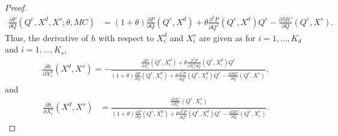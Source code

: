 \documentclass[11pt, a4paper]{article}
\theoremstyle{remark}
\begin{document}
\begin{proof}
\begin{align}
    \frac{\partial F}{\partial Q}(Q^e, X^{d}, X^{s}; \theta, MC) & = (1+\theta)\frac{\partial P}{\partial Q}(Q^e, X^{d}) + \theta\frac{\partial^2 P}{\partial Q^2}(Q^e, X^{d})Q^e - \frac{\partial MC}{\partial Q}(Q^e, X^{s}).
\end{align}
Thus, the derivative of $h$ with respect to $X^{d}_i$ and $X^{s}_i$ are given as for $i = 1, \ldots, K_d$ and $i = 1, \ldots, K_s$,
\begin{align}
    \frac{\partial h}{\partial X^{d}_{i}}(X^{d}, X^{s}) = -\frac{\frac{\partial P}{\partial X^{d}_{i}}(Q^e, X^{d}_i) + \theta\frac{\partial^2 P}{\partial X^{d}_{i}\partial Q}(Q^e, X^{d}_i)Q^e }{(1+\theta)\frac{\partial P}{\partial Q}(Q^e, X^{d}_i) + \theta\frac{\partial^2 P}{\partial Q^2}(Q^e, X^{d}_i)Q^e - \frac{\partial MC}{\partial Q}(Q^e, X^{s})}, \label{eq:foc_derivative_demand}
\end{align}
and
\begin{align}
    \frac{\partial h}{\partial X^{s}_{i}}(X^{d}, X^{s}) & = \frac{\frac{\partial MC}{\partial X^{s}_{i}}(Q^e, X^{s}_i)}{(1+\theta)\frac{\partial P}{\partial Q}(Q^e, X^{d}_i) + \theta\frac{\partial^2 P}{\partial Q^2}(Q^e, X^{d}_i)Q^e - \frac{\partial MC}{\partial Q}(Q^e, X^{s}_i)}. \label{eq:foc_derivative_supply}
\end{align}


\end{proof}
\end{document}
